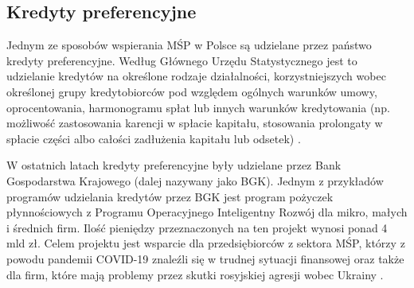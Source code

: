\documentclass[11pt]{article}
\begin{document}
\subsection*{Kredyty preferencyjne}

Jednym ze sposobów wspierania MŚP w Polsce są udzielane przez państwo kredyty preferencyjne.
Według Głównego Urzędu Statystycznego jest to udzielanie kredytów na określone rodzaje działalności, 
korzystniejszych wobec określonej grupy kredytobiorców pod względem ogólnych warunków umowy, oprocentowania, 
harmonogramu spłat lub innych warunków kredytowania (np. możliwość zastosowania karencji w spłacie kapitału, 
stosowania prolongaty w spłacie części albo całości zadłużenia kapitału lub odsetek) \cite{DefKredytPref}.

\medskip

W ostatnich latach kredyty preferencyjne były udzielane przez Bank Gospodarstwa Krajowego (dalej nazywany jako BGK).
Jednym z przykładów programów udzielania kredytów przez BGK jest program pożyczek płynnościowych z 
Programu Operacyjnego Inteligentny Rozwój dla mikro, małych i średnich firm.
Ilość pieniędzy przeznaczonych na ten projekt wynosi ponad 4 mld zł. Celem projektu jest wsparcie dla przedsiębiorców z sektora MŚP, 
którzy z powodu pandemii COVID-19 znaleźli się w trudnej sytuacji finansowej oraz także dla firm, które mają problemy przez skutki
rosyjskiej agresji wobec Ukrainy \cite{BgkProgramPlynnosci}.


\pagebreak

{}

\end{document}
